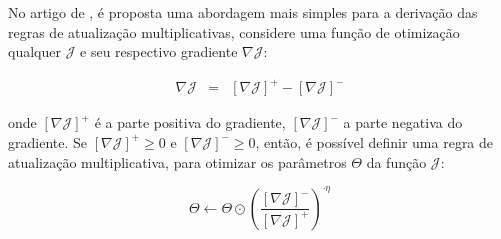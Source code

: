 \documentclass[
    12pt,                %
    oneside,            %
    a4paper,            %
    english,            %
    brazil                %
    ]{abntex2ppgsi}
\begin{document}



No artigo de , é proposta uma abordagem mais simples para a derivação das regras de atualização multiplicativas, considere uma função de otimização qualquer $\mathcal{J}$ e seu respectivo gradiente $\nabla \mathcal{J}$:

\[
\begin{array}{lclcl}
\nabla \mathcal{J} & = & [\nabla \mathcal{J}]^+ - [\nabla \mathcal{J}]^-
\end{array}
\]

onde $[\nabla \mathcal{J}]^+$ é a parte positiva do gradiente, $[\nabla \mathcal{J}]^-$ a parte negativa do gradiente.
Se $[\nabla \mathcal{J}]^+ \geq 0$ e $[\nabla \mathcal{J}]^- \geq 0$, então, é possível definir uma regra de atualização multiplicativa, para otimizar os parâmetros $\Theta$ da função $\mathcal{J}$:

\begin{equation}
\label{eq:onmtf:updateTheta}
\Theta \gets \Theta \odot \left ( \frac{ [\nabla \mathcal{J}]^- }{ [\nabla \mathcal{J}]^+ } \right )^{\cdot \eta}
\end{equation}
\end{document}
